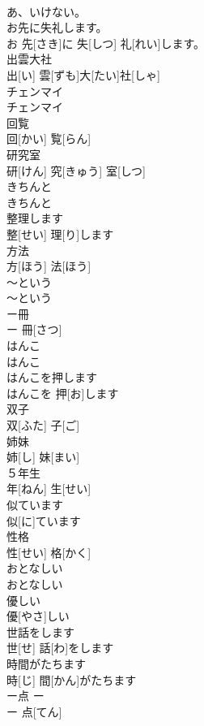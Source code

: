 \documentclass[8pt]{extreport}
\begin{document}
\begin{CJK}{UTF8}{min}
\\	あ、いけない。		
\\	お先に失礼します。	
\\	お 先[さき]に 失[しつ] 礼[れい]します。		
\\	出雲大社	
\\	出[い] 雲[ずも]大[たい]社[しゃ]		
\\	チェンマイ	
\\	チェンマイ		
\\	回覧	
\\	回[かい] 覧[らん]		
\\	研究室	
\\	研[けん] 究[きゅう] 室[しつ]		
\\	きちんと	
\\	きちんと		
\\	整理します	
\\	整[せい] 理[り]します		
\\	方法	
\\	方[ほう] 法[ほう]		
\\	～という	
\\	～という		
\\	ー冊	
\\	ー 冊[さつ]		
\\	はんこ	
\\	はんこ		
\\	はんこを押します	
\\	はんこを 押[お]します		
\\	双子	
\\	双[ふた] 子[ご]		
\\	姉妹	
\\	姉[し] 妹[まい]		
\\	５年生	
\\	年[ねん] 生[せい]		
\\	似ています	
\\	似[に]ています		
\\	性格	
\\	性[せい] 格[かく]		
\\	おとなしい	
\\	おとなしい		
\\	優しい	
\\	優[やさ]しい		
\\	世話をします	
\\	世[せ] 話[わ]をします		
\\	時間がたちます	
\\	時[じ] 間[かん]がたちます		
\\	ー点	ー 
\\	ー 点[てん]		

\end{CJK}
\end{document}
